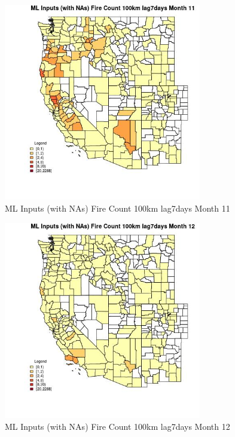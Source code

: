 \clearpage 

\begin{figure} 
\centering  
\includegraphics[width=0.77\textwidth]{Code_Outputs/Report_ML_input_PM25_Step4_part_e_de_duplicated_aves_compiled_2019-05-20wNAs_CountyFire_Count_100km_lag7daysmedianMonth11.jpg} 
\caption{\label{fig:Report_ML_input_PM25_Step4_part_e_de_duplicated_aves_compiled_2019-05-20wNAsCountyFire_Count_100km_lag7daysmedianMonth11}ML Inputs (with NAs) Fire Count 100km lag7days Month 11} 
\end{figure} 
 

\begin{figure} 
\centering  
\includegraphics[width=0.77\textwidth]{Code_Outputs/Report_ML_input_PM25_Step4_part_e_de_duplicated_aves_compiled_2019-05-20wNAs_CountyFire_Count_100km_lag7daysmedianMonth12.jpg} 
\caption{\label{fig:Report_ML_input_PM25_Step4_part_e_de_duplicated_aves_compiled_2019-05-20wNAsCountyFire_Count_100km_lag7daysmedianMonth12}ML Inputs (with NAs) Fire Count 100km lag7days Month 12} 
\end{figure} 
 


